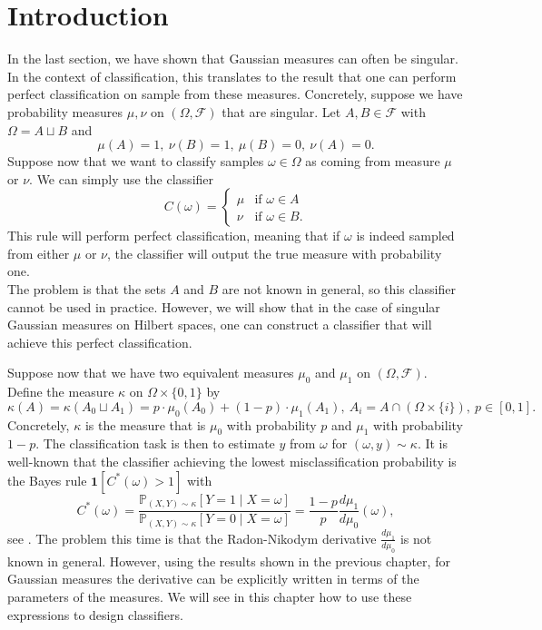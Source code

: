 \documentclass[10pt, a4paper]{report}
\newcommand{\Pp}[0]{\mathbb{P}}
\theoremstyle{definition}
\theoremstyle{remark}
\begin{document}
\section{Introduction}\label{sec:introclass}
In the last section, we have shown that Gaussian measures can often be singular. In the context of classification, this translates to the result that one can perform perfect classification on sample from these measures. Concretely, suppose we have probability measures $\mu,\nu$ on $(\Omega,\mathcal{F})$ that are singular. Let $A,B \in \mathcal{F}$ with $\Omega = A \sqcup B$ and
$$\mu(A)=1,\ \nu(B)=1,\ \mu(B)=0,\ \nu(A)=0.$$
Suppose now that we want to classify samples $\omega\in \Omega$ as coming from measure $\mu$ or $\nu$. We can simply use the classifier 
$$C(\omega) = 
\begin{cases}
	\mu & \text{if } \omega\in A\\
	\nu & \text{if } \omega\in B.
\end{cases}$$
This rule will perform perfect classification, meaning that if $\omega$ is indeed sampled from either $\mu$ or $\nu$, the classifier will output the true measure with probability one.\\
The problem is that the sets $A$ and $B$ are not known in general, so this classifier cannot be used in practice. However, we will show that in the case of singular Gaussian measures on Hilbert spaces, one can construct a classifier that will achieve this perfect classification.

Suppose now that we have two equivalent measures $\mu_0$ and $\mu_1$ on $(\Omega,\mathcal{F})$. Define the measure $\kappa$ on $\Omega\times \{0,1\}$ by 
$$\kappa(A) = \kappa\left(A_0 \sqcup A_1\right) = p\cdot \mu_0(A_0) + (1-p)\cdot\mu_1(A_1),\ A_i = A \cap (\Omega\times \{i\}), \ p\in [0,1].$$
Concretely, $\kappa$ is the measure that is $\mu_0$ with probability $p$ and $\mu_1$ with probability $1-p$. The classification task is then to estimate $y$ from $\omega$ for $(\omega,y)\sim \kappa$. It is well-known that the classifier achieving the lowest misclassification probability is the Bayes rule $\mathbf{1}[C^*(\omega)>1]$ with
\begin{equation}\label{bayesclass}
	C^*(\omega) = \frac{\Pp_{(X,Y)\sim \kappa}[Y=1\mid X=\omega]}{\Pp_{(X,Y)\sim \kappa}[Y=0\mid X=\omega]} =\frac{1-p}{p}\frac{d\mu_1}{d\mu_0}(\omega),
\end{equation}
see \cite[Theorem 2.1]{devroye}. The problem this time is that the Radon-Nikodym derivative $\frac{d\mu_1}{d\mu_0}$ is not known in general. However, using the results shown in the previous chapter, for Gaussian measures the derivative can be explicitly written in terms of the parameters of the measures. We will see in this chapter how to use these expressions to design classifiers.
\end{document}
